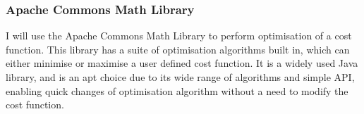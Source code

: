 \subsubsection{Apache Commons Math Library}

I will use the Apache Commons Math Library\cite{apachemath} to perform optimisation of a cost function. This library has a suite of optimisation algorithms built in, which can either minimise or maximise a user defined cost function. It is a widely used Java library, and is an apt choice due to its wide range of algorithms and simple API, enabling quick changes of optimisation algorithm without a need to modify the cost function.